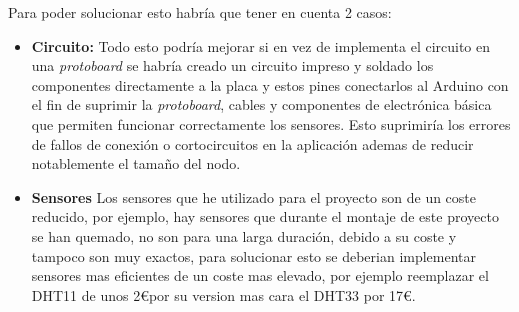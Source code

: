Para poder solucionar esto habría que tener en cuenta 2 casos:

\begin{itemize}
	\item \textbf{Circuito:} Todo esto podría mejorar si en vez de implementa el circuito en una \textit{protoboard} se habría creado un circuito impreso y soldado los componentes directamente a la placa y estos pines conectarlos al Arduino con el fin de suprimir la \textit{protoboard}, cables y componentes de electrónica básica que permiten funcionar correctamente los sensores. Esto suprimiría los errores de fallos de conexión o cortocircuitos en la aplicación ademas de reducir notablemente el tamaño del nodo.   
	
	\item \textbf{Sensores} Los sensores que he utilizado para el proyecto son de un coste reducido, por ejemplo, hay sensores que durante el montaje de este proyecto se han quemado, no son para una larga duración, debido a su coste y tampoco son muy exactos, para solucionar esto se deberian implementar sensores mas eficientes de un coste mas elevado, por ejemplo reemplazar el DHT11 de unos 2\euro por su version mas cara el DHT33 por 17\euro.

\end{itemize}



